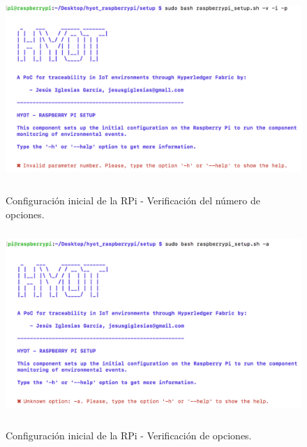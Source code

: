 \documentclass[12pt,a4paper, twoside]{report}
\begin{document}
\begin{enumerate}
\begin{itemize}
			\begin{figure}[!ht]   
				\caption{Configuración inicial de la RPi - Verificación del número de opciones.} 
				\begin{center} 
					\includegraphics[width=15cm,height=7cm]{Images/userGuide/setup/invalidNumber} \\
					\label{fig:userguide_setup_numberoptions} 
				\end{center}  
			\end{figure}
			
			\begin{figure}[!ht]   
				\caption{Configuración inicial de la RPi - Verificación de opciones.} 
				\begin{center} 
					\includegraphics[width=14cm,height=7cm]{Images/userGuide/setup/unknownOption} \\
					\label{fig:userguide_setup_validoptions} 
				\end{center}  
			\end{figure}
		
		\end{itemize}
	 \end{enumerate} 
	 
	 \newpage
	 
\end{document}
